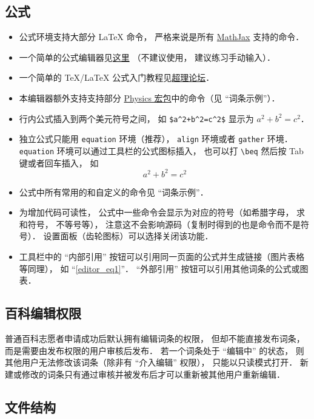 \subsection{公式}
\begin{itemize}
\item 公式环境支持大部分 LaTeX 命令， 严格来说是所有 \href{https://www.mathjax.org/}{MathJax} 支持的命令．
\item 一个简单的公式编辑器见\href{https://www.codecogs.com/latex/eqneditor.php}{这里} （不建议使用， 建议练习手动输入）．
\item 一个简单的 TeX/LaTeX 公式入门教程见\href{https://chaoli.club/index.php/211}{超理论坛}．
\item 本编辑器额外支持支持部分 \href{http://mirrors.ibiblio.org/CTAN/macros/latex/contrib/physics/physics.pdf}{Physics 宏包}中的命令（见 “词条示例”）．
\item 行内公式插入到两个美元符号之间， 如 \verb|$a^2+b^2=c^2$| 显示为 $a^2 + b^2 = c^2$．
\item 独立公式只能用 \verb|equation| 环境（推荐）， \verb|align| 环境或者 \verb|gather| 环境． \verb|equation| 环境可以通过工具栏的公式图标插入， 也可以打 \verb|\beq| 然后按 Tab 键或者回车插入， 如
\begin{equation}\label{editor_eq1}
a^2 + b^2 = c^2
\end{equation}
\item 公式中所有常用的和自定义的命令见 “词条示例”．
\item 为增加代码可读性， 公式中一些命令会显示为对应的符号（如希腊字母， 求和符号， 不等号等）， 注意这不会影响源码（复制时得到的也是命令而不是符号）． 设置面板（齿轮图标）可以选择关闭该功能．
\item 工具栏中的 “内部引用” 按钮可以引用同一页面的公式并生成链接（图片表格等同理）， 如 “\autoref{editor_eq1}”． “外部引用” 按钮可以引用其他词条的公式或图表．
\end{itemize}

\subsection{百科编辑权限}
普通百科志愿者申请成功后默认拥有编辑词条的权限， 但却不能直接发布词条， 而是需要由发布权限的用户审核后发布． 若一个词条处于 “编辑中” 的状态， 则其他用户无法修改该词条（除非有 “介入编辑” 权限）， 只能以只读模式打开． 新建或修改的词条只有通过审核并被发布后才可以重新被其他用户重新编辑．

\subsection{文件结构}

